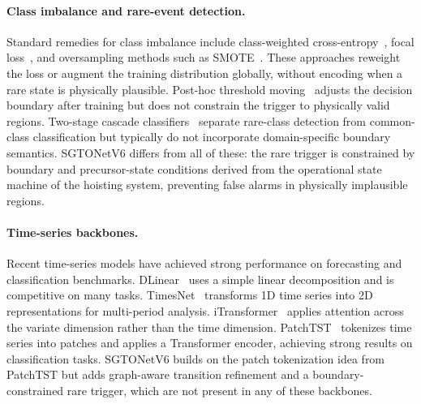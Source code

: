 \paragraph{Class imbalance and rare-event detection.}
Standard remedies for class imbalance include class-weighted cross-entropy~\cite{king2001logistic}, focal loss~\cite{lin2017focal}, and oversampling methods such as SMOTE~\cite{chawla2002smote}.
These approaches reweight the loss or augment the training distribution globally, without encoding when a rare state is physically plausible.
Post-hoc threshold moving~\cite{menon2021longtail} adjusts the decision boundary after training but does not constrain the trigger to physically valid regions.
Two-stage cascade classifiers~\cite{wang2016training} separate rare-class detection from common-class classification but typically do not incorporate domain-specific boundary semantics.
SGTONetV6 differs from all of these: the rare trigger is constrained by boundary and precursor-state conditions derived from the operational state machine of the hoisting system, preventing false alarms in physically implausible regions.

\paragraph{Time-series backbones.}
Recent time-series models have achieved strong performance on forecasting and classification benchmarks.
DLinear~\cite{zeng2023dlinear} uses a simple linear decomposition and is competitive on many tasks.
TimesNet~\cite{wu2023timesnet} transforms 1D time series into 2D representations for multi-period analysis.
iTransformer~\cite{liu2024itransformer} applies attention across the variate dimension rather than the time dimension.
PatchTST~\cite{nie2023patchtst} tokenizes time series into patches and applies a Transformer encoder, achieving strong results on classification tasks.
SGTONetV6 builds on the patch tokenization idea from PatchTST but adds graph-aware transition refinement and a boundary-constrained rare trigger, which are not present in any of these backbones.
